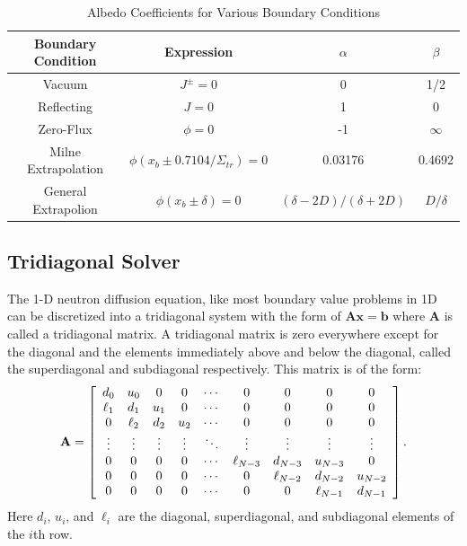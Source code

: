 \begin{table}[tb!]
\caption{Albedo Coefficients for Various Boundary Conditions}
\begin{center}
\begin{tabular}{|c|c|c|c|} \hline
  Boundary Condition	& Expression								& $\alpha$							& $\beta$			\\ \hline
  Vacuum				& $J^\pm = 0$ 								& 0									& 1/2				\\ 
  Reflecting			& $J = 0$									& 1									& 0					\\ 
  Zero-Flux				& $\phi = 0$								& -1								& $\infty$			\\ 
  Milne Extrapolation	& $\phi(x_b \pm 0.7104/\Sigma_{tr}) = 0$	& 0.03176							& 0.4692			\\
  General Extrapolion	& $\phi(x_b \pm \delta) = 0$				& $(\delta - 2D)/(\delta + 2D)$		& $D/\delta$		\\ \hline 
\end{tabular}
\end{center}
\label{Table:neutronics_albedoCoefficients}
\end{table}%

\subsection{Tridiagonal Solver}

The 1-D neutron diffusion equation, like most boundary value problems in 1D can be discretized into a tridiagonal system with the form of $\mathbf{Ax} = \mathbf{b}$ where $\mathbf{A}$ is called a tridiagonal matrix. A tridiagonal matrix is zero everywhere except for the diagonal and the elements immediately above and below the diagonal, called the superdiagonal and subdiagonal respectively. This matrix is of the form:
\begin{align}
  \mathbf{A} = \left[ \begin{array}{c c c c c c c c c} 
  d_{0}    & u_{0}    & 0      & 0      & \cdots & 0          & 0          & 0        & 0       \\
  \ell_{1} & d_{1}    & u_{1}  & 0      & \cdots & 0          & 0          & 0        & 0       \\
  0        & \ell_{2} & d_{2}  & u_{2}  & \cdots & 0          & 0          & 0        & 0       \\
  \vdots   & \vdots   & \vdots & \vdots & \ddots & \vdots     & \vdots     & \vdots   & \vdots  \\
  0        & 0        & 0      & 0      & \cdots & \ell_{N-3} & d_{N-3}    & u_{N-3}  & 0       \\
  0        & 0        & 0      & 0      & \cdots & 0		  & \ell_{N-2} & d_{N-2}  & u_{N-2} \\ 
  0        & 0        & 0      & 0      & \cdots & 0          & 0          & \ell_{N-1} & d_{N-1}   \\ 
  \end{array} \right] . 
\end{align}
Here $d_i$, $u_i$, and $\ell_i$ are the diagonal, superdiagonal, and subdiagonal elements of the $i$th row.


